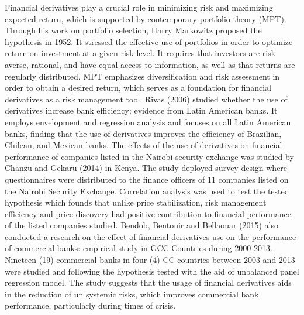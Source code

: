 \documentclass[a4 paper, 12pt]{report}
\theoremstyle{plain}
\begin{document}
\par Financial derivatives play a crucial role in minimizing risk and maximizing expected
return, which is supported by contemporary portfolio theory (MPT).\\
Through his work on portfolio selection, Harry Markowitz proposed the hypothesis in
1952. It stressed the effective use of portfolios in order to optimize return on investment
at a given risk level. It requires that investors are risk averse, rational, and have equal
access to information, as well as that returns are regularly distributed. MPT emphasizes
diversification and risk assessment in order to obtain a desired return, which serves as a
foundation for financial derivatives as a risk management tool. Rivas (2006) studied
whether the use of derivatives increase bank efficiency: evidence from Latin American
banks. It employs envelopment and regression analysis and focuses on all Latin American
banks, finding that the use of derivatives improves the efficiency of Brazilian, Chilean, and
Mexican banks. The effects of the use of derivatives on financial performance of
companies listed in the Nairobi security exchange was studied by Chanzu and Gekaru
(2014) in Kenya. The study deployed survey design where questionnaires were
distributed to the finance officers of 11 companies listed on the Nairobi Security
Exchange. Correlation analysis was used to test the tested hypothesis which founds that
unlike price stabilization, risk management efficiency and price discovery had positive
contribution to financial performance of the listed companies studied.
Bendob, Bentouir and Bellaouar (2015) also conducted a research on the effect of
financial derivatives use on the performance of commercial banks: empirical study in GCC
Countries during 2000-2013. Nineteen (19) commercial banks in four (4) CC countries
between 2003 and 2013 were studied and following the hypothesis tested with the aid of
unbalanced panel regression model. The study suggests that the usage of financial
derivatives aids in the reduction of un systemic risks, which improves commercial bank
performance, particularly during times of crisis.\\
\end{document}
